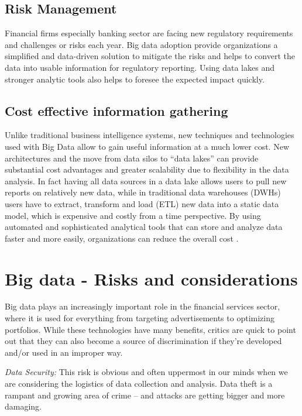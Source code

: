 \documentclass[sigconf]{acmart}
\begin{document}
\subsection{Risk Management}
Financial firms especially banking sector are facing new regulatory requirements and challenges or risks each year. Big data adoption provide organizations a simplified and data-driven solution to mitigate the risks and helps to convert the data into usable information for regulatory reporting. Using data lakes and stronger analytic tools   also helps to foresee the expected impact quickly\cite{https://www-935.ibm.com}.

\subsection{Cost effective information gathering}

Unlike traditional business intelligence systems, new techniques and technologies used with Big Data allow to gain useful information at a much lower cost. New architectures and the move from data silos to “data lakes” can provide substantial cost advantages and greater scalability due to flexibility in the data analysis. In fact having all data sources in a data lake allows users to pull new reports on relatively new data, while in traditional data warehouses (DWHs) users have to extract, transform and load (ETL) new data into a static data model, which is expensive and costly from a time perspective. By using automated and sophisticated analytical tools that can store and analyze data faster and more easily, organizations can reduce the overall cost \cite{Accenture-Next-Generation-Financial}.

\section{Big data - Risks and considerations}

Big data plays an increasingly important role in the financial services sector, where it is used for everything from targeting advertisements to optimizing portfolios. While these technologies have many benefits, critics are quick to point out that they can also become a source of discrimination if they're developed and/or used in an improper way\cite{risk-with-bigdata}.

\textit{Data Security:} This risk is obvious and often uppermost in our minds when we are considering the logistics of data collection and analysis. Data theft is a rampant and growing area of crime – and attacks are getting bigger and more damaging\cite{5risks-bigdata}.
\end{document}
